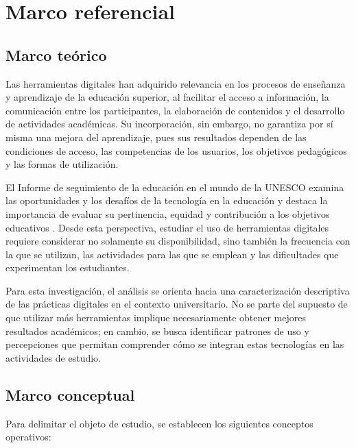 
\section{Marco referencial}

\subsection{Marco teórico}

Las herramientas digitales han adquirido relevancia en los procesos de enseñanza y aprendizaje de la educación superior, al facilitar el acceso a información, la comunicación entre los participantes, la elaboración de contenidos y el desarrollo de actividades académicas. Su incorporación, sin embargo, no garantiza por sí misma una mejora del aprendizaje, pues sus resultados dependen de las condiciones de acceso, las competencias de los usuarios, los objetivos pedagógicos y las formas de utilización.

El Informe de seguimiento de la educación en el mundo de la UNESCO examina las oportunidades y los desafíos de la tecnología en la educación y destaca la importancia de evaluar su pertinencia, equidad y contribución a los objetivos educativos \parencite{unesco2023tecnologia}. Desde esta perspectiva, estudiar el uso de herramientas digitales requiere considerar no solamente su disponibilidad, sino también la frecuencia con la que se utilizan, las actividades para las que se emplean y las dificultades que experimentan los estudiantes.

Para esta investigación, el análisis se orienta hacia una caracterización descriptiva de las prácticas digitales en el contexto universitario. No se parte del supuesto de que utilizar más herramientas implique necesariamente obtener mejores resultados académicos; en cambio, se busca identificar patrones de uso y percepciones que permitan comprender cómo se integran estas tecnologías en las actividades de estudio.

\subsection{Marco conceptual}

Para delimitar el objeto de estudio, se establecen los siguientes conceptos operativos:

